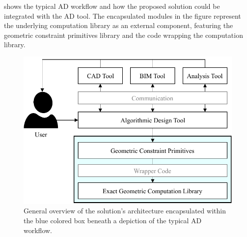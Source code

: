  shows the typical \ac{AD} workflow and how the proposed
solution could be integrated with the \ac{AD} tool. The encapsulated modules in
the figure represent the underlying computation library as an external
component, featuring the geometric constraint primitives library and the code
wrapping the computation library.

\begin{figure}[htbp]
  \includegraphics[width=\textwidth]{fig/solution-arch}
  \caption[Solution architecture within \acs{AD} workflow]{
    General overview of the solution's architecture encapsulated within the
    blue colored box beneath a depiction of the typical \ac{AD} workflow.}
  \label{fig:solution.arch}
\end{figure}
